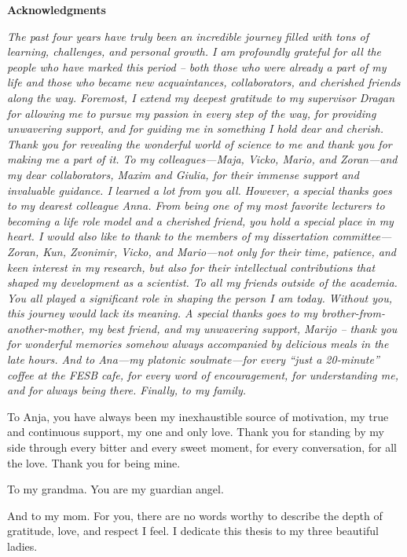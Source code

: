 \cleardoublepage

{}
{\LARGE\bf{Acknowledgments}}
\vskip 15mm

\normalfont\itshape
The past four years have truly been an incredible journey filled with tons of learning, challenges, and personal growth.
I am profoundly grateful for all the people who have marked this period -- both those who were already a part of my life and those who became new acquaintances, collaborators, and cherished friends along the way.
\vskip 5mm
Foremost, I extend my deepest gratitude to my supervisor Dragan for allowing me to pursue my passion in every step of the way, for providing unwavering support, and for guiding me in something I hold dear and cherish.
Thank you for revealing the wonderful world of science to me and thank you for making me a part of it.
\vskip 5mm
To my colleagues---Maja, Vicko, Mario, and Zoran---and my dear collaborators, Maxim and Giulia, for their immense support and invaluable guidance.
I learned a lot from you all.
However, a special thanks goes to my dearest colleague Anna.
From being one of my most favorite lecturers to becoming a life role model and a cherished friend, you hold a special place in my heart.
\vskip 5mm
I would also like to thank to the members of my dissertation committee---Zoran, Kun, Zvonimir, Vicko, and Mario---not only for their time, patience, and keen interest in my research, but also for their intellectual contributions that shaped my development as a scientist.
\vskip 5mm
To all my friends outside of the academia.
You all played a significant role in shaping the person I am today.
Without you, this journey would lack its meaning.
A special thanks goes to my brother-from-another-mother, my best friend, and my unwavering support, Marijo -- thank you for wonderful memories somehow always accompanied by delicious meals in the late hours.
And to Ana---my platonic soulmate---for every ``just a 20-minute'' coffee at the FESB cafe, for every word of encouragement, for understanding me, and for always being there.
\vskip 5mm
Finally, to my family.

To Anja, you have always been my inexhaustible source of motivation, my true and continuous support, my one and only love.
Thank you for standing by my side through every bitter and every sweet moment, for every conversation, for all the love.
Thank you for being mine. 

To my grandma. You are my guardian angel. 

And to my mom.
For you, there are no words worthy to describe the depth of gratitude, love, and respect I feel.
\vskip 5mm
I dedicate this thesis to my three beautiful ladies.
